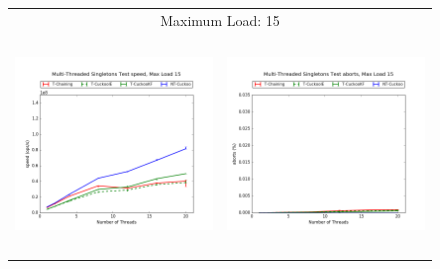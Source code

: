 \begin{figure}[h!]
\begin{tabular}{|cc|}
        \hline 
        \multicolumn{2}{|c|}{{\footnotesize Maximum Load: 15}}\\
        \includegraphics[height=2.25in]{maps/15HM125K:F90,I5,E5speed.png} &
        \includegraphics[height=2.25in]{maps/15HM125K:F90,I5,E5aborts.png}\\
    \hline 
    \end{tabular}
\label{fig:ntqueues}
\end{figure}
